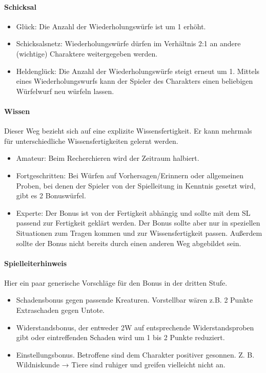 \documentclass{article}
\begin{document}
\paragraph{Schicksal}

\begin{itemize}
\item Glück: Die Anzahl der Wiederholungswürfe ist um 1 erhöht.
\item Schicksalsnetz: Wiederholungswürfe dürfen im Verhältnis 2:1 an andere (wichtige) Charaktere weitergegeben werden.
\item Heldenglück: Die Anzahl der Wiederholungswürfe steigt erneut um 1. Mittels eines Wiederholungswurfs kann der Spieler des Charakters einen beliebigen Würfelwurf neu würfeln lassen.
\end{itemize}

\paragraph{Wissen}

Dieser Weg bezieht sich auf eine explizite Wissensfertigkeit. Er kann mehrmals für unterschiedliche
Wissensfertigkeiten gelernt werden.

\begin{itemize}
\item Amateur: Beim Recherchieren wird der Zeitraum halbiert.
\item Fortgeschritten: Bei Würfen auf Vorhersagen/Erinnern oder allgemeinen Proben, bei denen der Spieler von der Spielleitung in Kenntnis gesetzt wird, gibt es 2 Bonuswürfel.
\item Experte: Der Bonus ist von der Fertigkeit abhängig und sollte mit dem SL passend zur Fertigkeit geklärt werden. Der Bonus sollte aber nur in speziellen Situationen zum Tragen kommen und zur Wissensfertigkeit passen. Außerdem sollte der Bonus nicht bereits durch einen anderen Weg abgebildet sein.
\end{itemize}

\begin{mdframed}[hidealllines=true, backgroundcolor=black!10]
\paragraph{Spielleiterhinweis}

Hier ein paar generische Vorschläge für den Bonus in der dritten Stufe.

\begin{itemize}
\item Schadensbonus gegen passende Kreaturen. Vorstellbar wären z.B. 2 Punkte Extraschaden gegen Untote.
\item Widerstandsbonus, der entweder 2W auf entsprechende Widerstandsproben gibt oder eintreffenden Schaden wird um 1 bis 2 Punkte reduziert.
\item Einstellungsbonus. Betroffene sind dem Charakter positiver gesonnen. Z. B. Wildniskunde → Tiere sind ruhiger und greifen vielleicht nicht an.
\end{itemize}



\end{mdframed}
\end{document}
